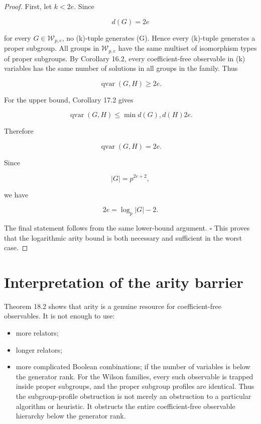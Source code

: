 \documentclass[11pt]{article}
\begin{document}
\begin{proof}
First, let $k<2e$. Since

\[
d(G)=2e
\]

for every $G\in\mathcal W_{p,e}$, no (k)-tuple generates (G). Hence every (k)-tuple generates a proper subgroup. All groups in $\mathcal W_{p,e}$ have the same multiset of isomorphism types of proper subgroups. By Corollary 16.2, every coefficient-free observable in (k) variables has the same number of solutions in all groups in the family. Thus

\[
\operatorname{qvar}(G,H)\ge 2e.
\]

For the upper bound, Corollary 17.2 gives

\[
\operatorname{qvar}(G,H)
\le
\min{d(G),d(H)}
2e.
\]

Therefore

\[
\operatorname{qvar}(G,H)=2e.
\]

Since

\[
|G|=p^{2e+2},
\]

we have

\[
2e=\log_p|G|-2.
\]

The final statement follows from the same lower-bound argument. $\square$ This proves that the logarithmic arity bound is both necessary and sufficient in the worst case.

\end{proof}

\section{Interpretation of the arity barrier}

Theorem 18.2 shows that arity is a genuine resource for coefficient-free observables. It is not enough to use:

\begin{itemize}
\item more relators;
\item longer relators;
\item more complicated Boolean combinations;
if the number of variables is below the generator rank. For the Wilson families, every such observable is trapped inside proper subgroups, and the proper subgroup profiles are identical. Thus the subgroup-profile obstruction is not merely an obstruction to a particular algorithm or heuristic. It obstructs the entire coefficient-free observable hierarchy below the generator rank.

\end{itemize}
\end{document}
